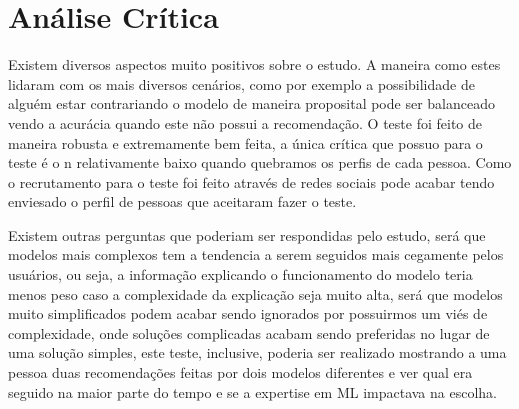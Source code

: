 \documentclass{article}
\begin{document}
\section{Análise Crítica}
Existem diversos aspectos muito positivos sobre o estudo. A maneira como estes lidaram com os mais diversos cenários, como por exemplo a possibilidade de alguém estar contrariando o modelo de maneira proposital pode ser balanceado vendo a acurácia quando este não possui a recomendação. O teste foi feito de maneira robusta e extremamente bem feita, a única crítica que possuo para o teste é o n relativamente baixo quando quebramos os perfis de cada pessoa. Como o recrutamento para o teste foi feito através de redes sociais pode acabar tendo enviesado o perfil de pessoas que aceitaram fazer o teste.

Existem outras perguntas que poderiam ser respondidas pelo estudo, será que modelos mais complexos tem a tendencia a serem seguidos mais cegamente pelos usuários, ou seja, a informação explicando o funcionamento do modelo teria menos peso caso a complexidade da explicação seja muito alta, será que modelos muito simplificados podem acabar sendo ignorados por possuirmos um viés de complexidade, onde soluções complicadas acabam sendo preferidas no lugar de uma solução simples, este teste, inclusive, poderia ser realizado mostrando a uma pessoa duas recomendações feitas por dois modelos diferentes e ver qual era seguido na maior parte do tempo e se a expertise em ML impactava na escolha.
\end{document}
